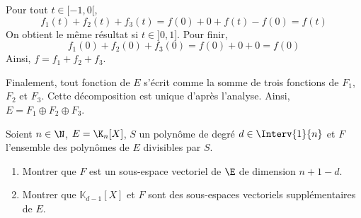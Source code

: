 \documentclass[a4paper,10pt]{report}
\begin{document}
\medskip

\noindent Pour tout $t \in [-1,0[$,
$$ f_1(t)+f_2(t)+f_3(t) = f(0) + 0 + f(t)-f(0) = f(t)$$
On obtient le même résultat si $t \in ]0,1]$. Pour finir,
$$ f_1(0)+f_2(0)+f_3(0) = f(0) + 0 + 0 = f(0)$$
Ainsi, $f=f_1+f_2+f_3$.

\medskip

\noindent Finalement, tout fonction de $E$ s'écrit comme la somme de trois fonctions de $F_1$, $F_2$ et $F_3$. Cette décomposition est unique d'après l'analyse. Ainsi, $E = F_1 \oplus F_2 \oplus F_3$.

\medskip

\begin{Exa} Soient $n\in\N$, $E=\K_n[X]$, $S$ un polynôme de degré $d \in \Interv{1}{n}$ et $F$ l'ensemble des polynômes de $E$ divisibles par $S$.
\begin{enumerate}
	\item Montrer que $F$ est un sous-espace vectoriel de $\E$ de dimension $n+1-d$.
	\item Montrer que $\mathbb{K}_{d-1}[X]$  et $F$ sont des sous-espaces vectoriels supplémentaires de $E$.
\end{enumerate} 
\end{Exa}
\end{document}
